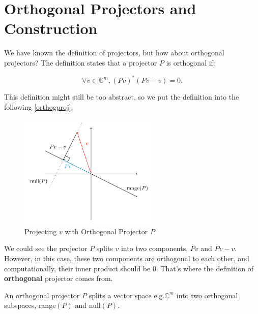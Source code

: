 

\section{Orthogonal Projectors and Construction}%
We have known the definition of projectors, but how about orthogonal projectors? The definition states that a projector $P$ is orthogonal if:
\begin{definition}
  \[
  \forall v \in \mathbb{C}^{m}, (Pv)^{*}(Pv - v) = 0
  .\] 
\end{definition}
This definition might still be too abstract, so we put the definition into the following \autoref{orthogproj}:
  \begin{figure}[H]
    \centering
    \includegraphics[width=0.6\textwidth]{imgs/orthogonal_proj.png}
    \caption{Projecting $v$ with Orthogonal Projector $P$}
    \label{orthogproj}
  \end{figure}

\noindent We could see the projector $P$ splits $v$ into two components,  $Pv$ and  $Pv - v$. However, in this case, these two components are orthogonal to each other, and computationally, their inner product should be 0. That's where the definition of  \textbf{orthogonal} projector comes from. 
\begin{corollary}
  An orthogonal projector \(P\) splits a vector space e.g.$\mathbb{C}^{m}$ into two orthogonal subspaces, range$(P)$ and null$(P)$.
\end{corollary}

